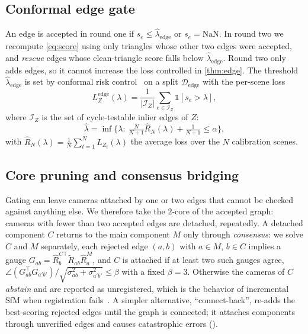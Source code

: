 \subsection{Conformal edge gate}
An edge is accepted in round one if $s_e\le\hat\lambda_{\mathrm{edge}}$ or $s_e=\mathrm{NaN}$. In round two we recompute \eqref{eq:score} using only triangles whose other two edges were accepted, and \emph{rescue} edges whose clean-triangle score falls below $\hat\lambda_{\mathrm{edge}}$. Round two only adds edges, so it cannot increase the loss controlled in \cref{thm:edge}. The threshold $\hat\lambda_{\mathrm{edge}}$ is set by conformal risk control~\cite{angelopoulos2024crc} on a split $\mathcal{D}_{\mathrm{edge}}$ with the per-scene loss
\begin{equation}\label{eq:edgeloss}
L^{\mathrm{edge}}_Z(\lambda)=\frac{1}{|\mathcal{I}_Z|}\sum_{e\in\mathcal{I}_Z}\mathbb{1}[s_e>\lambda],
\end{equation}
where $\mathcal{I}_Z$ is the set of cycle-testable inlier edges of $Z$:
\begin{equation}\label{eq:crc}
\hat\lambda=\inf\Big\{\lambda:\ \tfrac{N}{N+1}\hat R_N(\lambda)+\tfrac{1}{N+1}\le\alpha\Big\},
\end{equation}
with $\hat R_N(\lambda)=\frac1N\sum_{t=1}^{N}L_{Z_t}(\lambda)$ the average loss over the $N$ calibration scenes.

\subsection{Core pruning and consensus bridging}
Gating can leave cameras attached by one or two edges that cannot be checked against anything else. We therefore take the $2$-core of the accepted graph: cameras with fewer than two accepted edges are detached, repeatedly. A detached component $C$ returns to the main component $M$ only through \emph{consensus}: we solve $C$ and $M$ separately, each rejected edge $(a,b)$ with $a\in M$, $b\in C$ implies a gauge $G_{ab}=\hat R_b^{C\top}\tilde R_{ab}\hat R_a^{M}$, and $C$ is attached if at least two such gauges agree, $\angle(G_{ab}^{\top}G_{a'b'})/\sqrt{\sigma_{ab}^2+\sigma_{a'b'}^2}\le\beta$ with a fixed $\beta=3$. Otherwise the cameras of $C$ \emph{abstain} and are reported as unregistered, which is the behavior of incremental SfM when registration fails~\cite{schoenberger2016sfm}. A simpler alternative, ``connect-back'', re-adds the best-scoring rejected edges until the graph is connected; it attaches components through unverified edges and causes catastrophic errors ().

